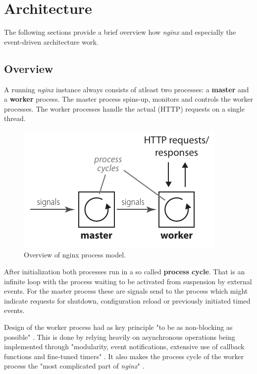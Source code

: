 \section{Architecture}
\label{sec:nginx-arch}

The following sections provide a brief overview how \textit{nginx} and especially the event-driven architecture work.

\subsection{Overview}

A running \textit{nginx} instance always consists of atleast two processes: a \textbf{master} and a \textbf{worker} process. The master process spins-up, monitors and controls the worker processes. The worker processes handle the actual (HTTP) requests on a single thread.

\setlength{\intextsep}{0pt}
\begin{figure}
	\centering
	\includegraphics[scale=1]{images/nginx-overview.pdf}
	\caption{Overview of nginx process model.}
	\label{fig:nginx-overview}
\end{figure}

After initialization both processes run in a so called \textbf{process cycle}. That is an infinite loop with the process waiting to be activated from suspension by external events. For the master process these are signals send to the process which might indicate requests for shutdown, configuration reload or previously initiated timed events.

Design of the worker process had as key principle "to be as non-blocking as possible" \cite{aosa}. This is done by relying heavily on asynchronous operations being implemented through "modularity, event notifications, extensive use of callback functions and fine-tuned timers" \cite{aosa}. It also makes the process cycle of the worker process the "most complicated part of \textit{nginx}" \cite{aosa}.

